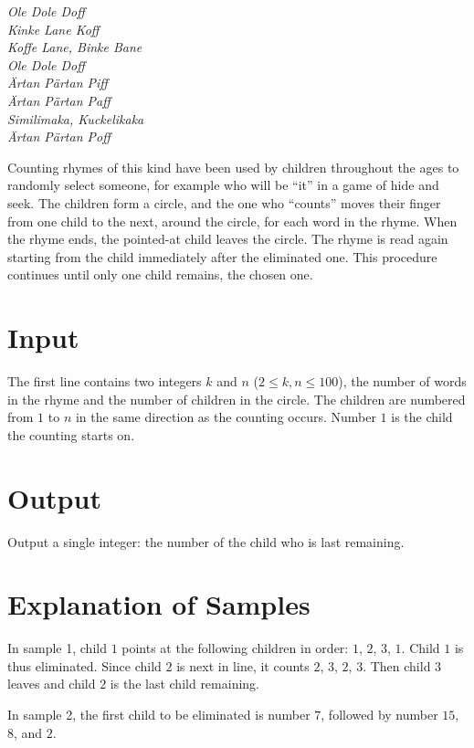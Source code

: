 

{\em
Ole Dole Doff\\
Kinke Lane Koff\\
Koffe Lane, Binke Bane\\
Ole Dole Doff \\
Ärtan Pärtan Piff\\
Ärtan Pärtan Paff \\
Similimaka, Kuckelikaka\\
Ärtan Pärtan Poff
}

Counting rhymes of this kind have been used by children throughout the ages to randomly select someone, for example who will be ``it'' in a game of hide and seek. The children form a circle, and the one who ``counts'' moves their finger from one child to the next, around the circle, for each word in the rhyme. When the rhyme ends, the pointed-at child leaves the circle. The rhyme is read again starting from the child immediately after the eliminated one. This procedure continues until only one child remains, the chosen one.

\section*{Input}
The first line contains two integers $k$ and $n$ ($2 \leq k,n \leq 100$), the number of words in the rhyme and the number of children in the circle. The children are numbered from $1$ to $n$ in the same direction as the counting occurs. Number $1$ is the child the counting starts on.

\section*{Output}
Output a single integer: the number of the child who is last remaining.

\section*{Explanation of Samples}
In sample 1, child $1$ points at the following children in order: $1$, $2$, $3$, $1$. Child $1$ is thus eliminated. Since child $2$ is next in line, it counts $2$, $3$, $2$, $3$. Then child $3$ leaves and child $2$ is the last child remaining.

In sample 2, the first child to be eliminated is number $7$, followed by number $15$, $8$, and $2$.
